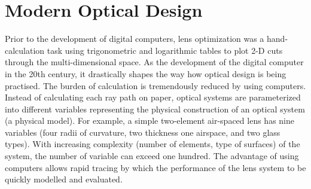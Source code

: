 \section{Modern Optical Design}
\vspace{1em}
Prior to the development of digital computers, lens optimization was a hand-calculation task using trigonometric and logarithmic tables to plot 2-D cuts through the multi-dimensional space. As the development of the digital computer in the 20th century, it drastically shapes the way how optical design is being practised. The burden of calculation is tremendously reduced by using computers. Instead of calculating each ray path on paper,  optical systems are parameterized into different variables representing the physical construction of an optical system (a physical model). For example, a simple two-element air-spaced lens has nine variables (four radii of curvature, two thickness one airspace, and two glass types). With increasing complexity (number of elements, type of surfaces) of the system, the number of variable can exceed one hundred. The advantage of using computers allows rapid tracing by which the performance of the lens system to be quickly modelled and evaluated. 

